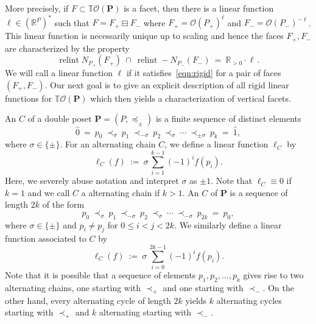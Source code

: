 \documentclass[11pt]{amsart}
\theoremstyle{definition}
\begin{document}
More precisely, if $F \subset {{\mathbb{T}}{\mathcal{O}({\mathbf{P}})}}$ is a facet, then there is a
linear function $\ell \in ({\mathbb{R}}^{P})^*$ such that $F = {{{F_+} \boxminus {F_-}}}$ where
$F_+ = {\mathcal{O}({{P}_+})}^\ell$ and $F_- = {\mathcal{O}({{P}_-})}^{-\ell}$. This linear function
is necessarily unique up to scaling and hence the faces $F_+,F_-$ are
characterized by the property
\begin{equation}\label{eqn:rigid}
    \operatorname{relint} {N}_{{P}_+}(F_+)  \ \cap \
    \operatorname{relint} -{N}_{{P}_-}(F_-) \ = \ {\mathbb{R}}_{>0} \cdot \ell \, .
\end{equation}
We will call a linear function $\ell$ {\textbf{\color{black}{rigid}}} if it
satisfies~\eqref{eqn:rigid} for a pair of faces $(F_+,F_-)$.  Our next goal is
to give an explicit description of all rigid linear functions for
${{\mathbb{T}}{\mathcal{O}({\mathbf{P}})}}$ which then yields a characterization of vertical facets.

An {\textbf{\color{black}{alternating chain}}} $C$ of a double poset ${\mathbf{P}} = (P,\preceq_\pm)$ is a
finite sequence of distinct elements
\[
    {\widehat{0}} \ = \ 
    p_0 \ \prec_{\sigma} \
    p_1 \ \prec_{-\sigma} \
    p_2 \ \prec_{\sigma} \
    \cdots \ \prec_{\pm\sigma} \
    p_k \ = \ {\widehat{1}},
\]
where $\sigma \in \{\pm\}$. For an alternating chain $C$, we define a linear
function $\ell_C$ by 
\[
    \ell_C(f) \ := \ \sigma \, \sum_{i=1}^{k-1} (-1)^i f(p_i).
\]
Here, we severely abuse notation and interpret $\sigma$ as $\pm 1$.  Note that
$\ell_C \equiv 0$ if $k=1$ and we call $C$ a {\textbf{\color{black}{proper}}} alternating chain
if $k > 1$.  An {\textbf{\color{black}{alternating cycle}}} $C$ of ${\mathbf{P}}$ is a sequence of length
$2k$ of the form
\[
    p_0 \ \prec_{\sigma} \ p_1 \ \prec_{-\sigma} \ p_2 \ \prec_{\sigma} \
    \cdots \ \prec_{-\sigma} \ p_{2k} \
    = \ p_0,
\]
where $\sigma \in \{\pm\}$ and $p_i \neq p_j$ for $0 \le i < j < 2k$. We
similarly define a linear function associated to $C$ by
\[
    \ell_C(f) \ := \ \sigma \, \sum_{i=0}^{2k-1} (-1)^i f(p_i).
\]
Note that it is possible that a sequence of elements $p_1,p_2,\dots,p_k$ gives
rise to two alternating chains, one starting with $\prec_+$ and one starting
with $\prec_-$.  On the other hand, every alternating cycle of length $2k$
yields $k$ alternating cycles starting with $\prec_+$ and $k$ alternating
starting with $\prec_-$.
\end{document}
